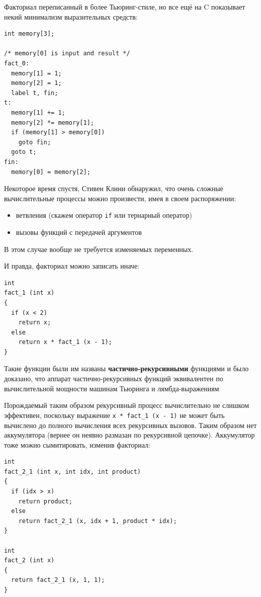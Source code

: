 \documentclass[a4paper,12pt,oneside]{article}
\begin{document}
Факториал переписанный в более Тьюринг-стиле, но все ещё на C показывает некий минимализм выразительных средств:

\begin{lstlisting}
int memory[3];

/* memory[0] is input and result */
fact_0:
  memory[1] = 1;
  memory[2] = 1;
  label t, fin;
t:
  memory[1] += 1;
  memory[2] *= memory[1];
  if (memory[1] > memory[0]) 
    goto fin;
  goto t;
fin:
  memory[0] = memory[2];
\end{lstlisting}

Некоторое время спустя, Стивен Клини обнаружил, что очень сложные вычислительные процессы можно произвести, имея в своем распоряжении:

\begin{itemize}
\item ветвления (скажем оператор \lstinline!if! или тернарный оператор)
\item вызовы функций с передачей аргументов
\end{itemize}

В этом случае вообще не требуется изменяемых переменных.

И правда, факториал можно записать иначе:

\begin{lstlisting}
int
fact_1 (int x)
{
  if (x < 2)
    return x;
  else
    return x * fact_1 (x - 1);
}
\end{lstlisting}

Такие функции были им названы \textbf{частично-рекурсивными} функциями и было доказано, что аппарат частично-рекурсивных функций эквивалентен по вычислительной мощности машинам Тьюринга и лямбда-выражениям

Порождаемый таким образом рекурсивный процесс вычислительно не слишком эффективен, поскольку выражение \lstinline!x * fact_1 (x - 1)! не может быть вычислено до полного вычисления всех рекурсивных вызовов. Таким образом нет аккумулятора (вернее он неявно размазан по рекурсивной цепочке). Аккумулятор тоже можно сымитировать, изменив факториал:

\begin{lstlisting}
int
fact_2_1 (int x, int idx, int product)
{
  if (idx > x)
    return product;
  else
    return fact_2_1 (x, idx + 1, product * idx);
}

int
fact_2 (int x)
{
  return fact_2_1 (x, 1, 1);
}

\end{lstlisting}
\end{document}
